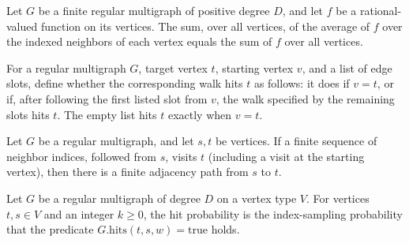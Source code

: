\begin{theorem}
\label{Randomized.RegularMultigraph.sum_avg}
\leanok
{}
Let $G$ be a finite regular multigraph of positive degree $D$, and let $f$ be a
rational-valued function on its vertices. The sum, over all vertices, of the average of
$f$ over the indexed neighbors of each vertex equals the sum of $f$ over all vertices.
\end{theorem}

\begin{definition}
\label{Randomized.RegularMultigraph.hits}
\leanok
For a regular multigraph $G$, target vertex $t$, starting vertex $v$, and a list of edge
slots, define whether the corresponding walk hits $t$ as follows: it does if $v=t$, or
if, after following the first listed slot from $v$, the walk specified by the remaining
slots hits $t$. The empty list hits $t$ exactly when $v=t$.
\end{definition}

\begin{theorem}
\label{Randomized.RegularMultigraph.reflTransGen_of_hits}
\leanok
{}
Let $G$ be a regular multigraph, and let $s,t$ be vertices. If a finite sequence of
neighbor indices, followed from $s$, visits $t$ (including a visit at the starting
vertex), then there is a finite adjacency path from $s$ to $t$.
\end{theorem}

\begin{definition}
\label{Randomized.RegularMultigraph.hitProb}
\leanok
{}
Let $G$ be a regular multigraph of degree $D$ on a vertex type $V$. For vertices $t,s\in
V$ and an integer $k\ge 0$, the hit probability is the index-sampling probability that
the predicate $G.\mathrm{hits}(t,s,w)=\mathrm{true}$ holds.
\end{definition}

